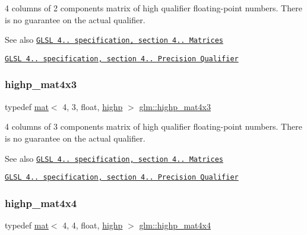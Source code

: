 4 columns of 2 components matrix of high qualifier floating-\/point numbers. There is no guarantee on the actual qualifier.

\begin{DoxySeeAlso}{See also}
\href{http://www.opengl.org/registry/doc/GLSLangSpec.4.20.8.pdf}{\tt G\+L\+SL 4.. specification, section 4.. Matrices} 

\href{http://www.opengl.org/registry/doc/GLSLangSpec.4.20.8.pdf}{\tt G\+L\+SL 4.. specification, section 4.. Precision Qualifier} 
\end{DoxySeeAlso}
\mbox{\label{group__core__precision_ga20620a62fd7d4e020e772c4d258cf2e4}} 
\subsubsection{\texorpdfstring{highp\+\_\+mat4x3}{highp\_mat4x3}}
{\footnotesize\ttfamily typedef \mbox{\hyperlink{structglm_1_1mat}{mat}}$<$ 4, 3, float, \mbox{\hyperlink{namespaceglm_a36ed105b07c7746804d7fdc7cc90ff25ac6f7eab42eacbb10d59a58e95e362074}{highp}} $>$ \mbox{\hyperlink{group__core__precision_ga20620a62fd7d4e020e772c4d258cf2e4}{glm\+::highp\+\_\+mat4x3}}}

4 columns of 3 components matrix of high qualifier floating-\/point numbers. There is no guarantee on the actual qualifier.

\begin{DoxySeeAlso}{See also}
\href{http://www.opengl.org/registry/doc/GLSLangSpec.4.20.8.pdf}{\tt G\+L\+SL 4.. specification, section 4.. Matrices} 

\href{http://www.opengl.org/registry/doc/GLSLangSpec.4.20.8.pdf}{\tt G\+L\+SL 4.. specification, section 4.. Precision Qualifier} 
\end{DoxySeeAlso}
\mbox{\label{group__core__precision_ga93c7db376e7b0bd24ef4947667468c9a}} 
\subsubsection{\texorpdfstring{highp\+\_\+mat4x4}{highp\_mat4x4}}
{\footnotesize\ttfamily typedef \mbox{\hyperlink{structglm_1_1mat}{mat}}$<$ 4, 4, float, \mbox{\hyperlink{namespaceglm_a36ed105b07c7746804d7fdc7cc90ff25ac6f7eab42eacbb10d59a58e95e362074}{highp}} $>$ \mbox{\hyperlink{group__core__precision_ga93c7db376e7b0bd24ef4947667468c9a}{glm\+::highp\+\_\+mat4x4}}}

